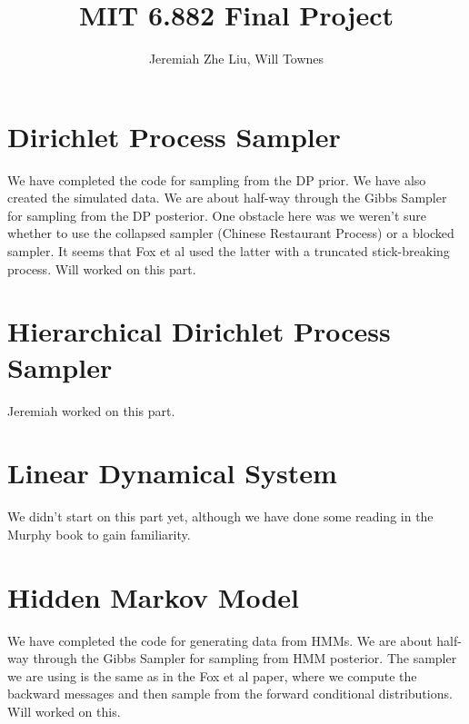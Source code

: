 \documentclass[12pt]{article}
\begin{document}
\title{MIT 6.882 Final Project}
\author{Jeremiah Zhe Liu,  Will Townes}
\maketitle


\section{Dirichlet Process Sampler}
We have completed the code for sampling from the DP prior. We have also created the simulated data. We are about half-way through the Gibbs Sampler for sampling from the DP posterior. One obstacle here was we weren't sure whether to use the collapsed sampler (Chinese Restaurant Process) or a blocked sampler. It seems that Fox et al used the latter with a truncated stick-breaking process. Will worked on this part.



\section{Hierarchical Dirichlet Process Sampler}
Jeremiah worked on this part.

\section{Linear Dynamical System}
We didn't start on this part yet, although we have done some reading in the Murphy book to gain familiarity.

\section{Hidden Markov Model}
We have completed the code for generating data from HMMs. We are about half-way through the Gibbs Sampler for sampling from HMM posterior. The sampler we are using is the same as in the Fox et al paper, where we compute the backward messages and then sample from the forward conditional distributions. Will worked on this.
\end{document}
